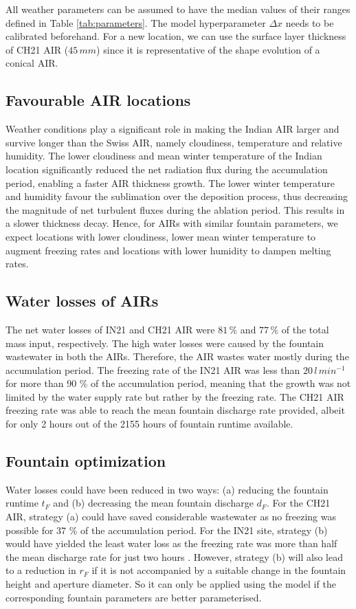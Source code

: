 \documentclass[utf8]{frontiersSCNS}
\begin{document}
All weather parameters can be assumed to have the median values of their ranges defined in Table
\ref{tab:parameters}. The model hyperparameter $\Delta x$ needs to be calibrated beforehand. For a new location,
we can use the surface layer thickness of CH21 AIR ($45\,mm$) since it is representative of the shape evolution
of a conical AIR.


\subsection{Favourable AIR locations}

Weather conditions play a significant role in making the Indian AIR larger and survive longer than the Swiss
AIR, namely cloudiness, temperature and relative humidity. The lower cloudiness and mean winter temperature of
the Indian location significantly reduced the net radiation flux during the accumulation period, enabling a
faster AIR thickness growth. The lower winter temperature and humidity favour the sublimation over the
deposition process, thus decreasing the magnitude of net turbulent fluxes during the ablation period. This results
in a slower thickness decay. Hence, for AIRs with similar fountain parameters, we expect locations with lower
cloudiness, lower mean winter temperature to augment freezing rates and locations with lower humidity to dampen
melting rates.

\subsection{Water losses of AIRs}

The net water losses of IN21 and CH21 AIR were $81\,\%$ and $77\,\%$ of the total mass input, respectively. The
high water losses were caused by the fountain wastewater in both the AIRs. Therefore, the AIR wastes water
mostly during the accumulation period. The freezing rate of the IN21 AIR was less than $20 \, l\,min^{-1}$ for
more than 90 \% of the accumulation period, meaning that the growth was not limited by the water supply rate but
rather by the freezing rate. The CH21 AIR freezing rate was able to reach the mean fountain discharge rate
provided, albeit for only 2 hours out of the 2155 hours of fountain runtime available. 

\subsection{Fountain optimization}

Water losses could have been reduced in two ways: (a) reducing the fountain runtime $t_F$ and (b) decreasing the
mean fountain discharge $d_F$. For the CH21 AIR, strategy (a) could have saved considerable wastewater as no
freezing was possible for 37 \% of the accumulation period. For the IN21 site, strategy (b) would have yielded
the least water loss as the freezing rate was more than half the mean discharge rate for just two hours . However,
strategy (b) will also lead to a reduction in $r_F$ if it is not accompanied by a suitable change in the
fountain height and aperture diameter. So it can only be applied using the model if the corresponding fountain
parameters are better parameterised.
\end{document}
